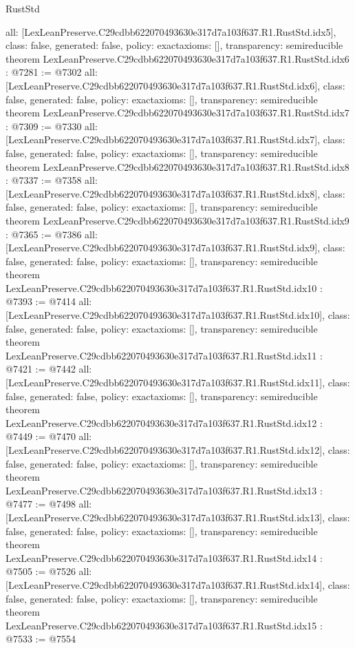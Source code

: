 \begin{lexlean}{RustStd}
\begin{coremodule}
{  all: [LexLeanPreserve.C29cdbb622070493630e317d7a103f637.R1.RustStd.idx5],
  class: false,
  generated: false,
  policy: exact{axioms: []},
  transparency: semireducible
}
theorem LexLeanPreserve.C29cdbb622070493630e317d7a103f637.R1.RustStd.idx6 : @7281 := @7302 {
  all: [LexLeanPreserve.C29cdbb622070493630e317d7a103f637.R1.RustStd.idx6],
  class: false,
  generated: false,
  policy: exact{axioms: []},
  transparency: semireducible
}
theorem LexLeanPreserve.C29cdbb622070493630e317d7a103f637.R1.RustStd.idx7 : @7309 := @7330 {
  all: [LexLeanPreserve.C29cdbb622070493630e317d7a103f637.R1.RustStd.idx7],
  class: false,
  generated: false,
  policy: exact{axioms: []},
  transparency: semireducible
}
theorem LexLeanPreserve.C29cdbb622070493630e317d7a103f637.R1.RustStd.idx8 : @7337 := @7358 {
  all: [LexLeanPreserve.C29cdbb622070493630e317d7a103f637.R1.RustStd.idx8],
  class: false,
  generated: false,
  policy: exact{axioms: []},
  transparency: semireducible
}
theorem LexLeanPreserve.C29cdbb622070493630e317d7a103f637.R1.RustStd.idx9 : @7365 := @7386 {
  all: [LexLeanPreserve.C29cdbb622070493630e317d7a103f637.R1.RustStd.idx9],
  class: false,
  generated: false,
  policy: exact{axioms: []},
  transparency: semireducible
}
theorem LexLeanPreserve.C29cdbb622070493630e317d7a103f637.R1.RustStd.idx10 : @7393 := @7414 {
  all: [LexLeanPreserve.C29cdbb622070493630e317d7a103f637.R1.RustStd.idx10],
  class: false,
  generated: false,
  policy: exact{axioms: []},
  transparency: semireducible
}
theorem LexLeanPreserve.C29cdbb622070493630e317d7a103f637.R1.RustStd.idx11 : @7421 := @7442 {
  all: [LexLeanPreserve.C29cdbb622070493630e317d7a103f637.R1.RustStd.idx11],
  class: false,
  generated: false,
  policy: exact{axioms: []},
  transparency: semireducible
}
theorem LexLeanPreserve.C29cdbb622070493630e317d7a103f637.R1.RustStd.idx12 : @7449 := @7470 {
  all: [LexLeanPreserve.C29cdbb622070493630e317d7a103f637.R1.RustStd.idx12],
  class: false,
  generated: false,
  policy: exact{axioms: []},
  transparency: semireducible
}
theorem LexLeanPreserve.C29cdbb622070493630e317d7a103f637.R1.RustStd.idx13 : @7477 := @7498 {
  all: [LexLeanPreserve.C29cdbb622070493630e317d7a103f637.R1.RustStd.idx13],
  class: false,
  generated: false,
  policy: exact{axioms: []},
  transparency: semireducible
}
theorem LexLeanPreserve.C29cdbb622070493630e317d7a103f637.R1.RustStd.idx14 : @7505 := @7526 {
  all: [LexLeanPreserve.C29cdbb622070493630e317d7a103f637.R1.RustStd.idx14],
  class: false,
  generated: false,
  policy: exact{axioms: []},
  transparency: semireducible
}
theorem LexLeanPreserve.C29cdbb622070493630e317d7a103f637.R1.RustStd.idx15 : @7533 := @7554 {
}
\end{coremodule}
\end{lexlean}
